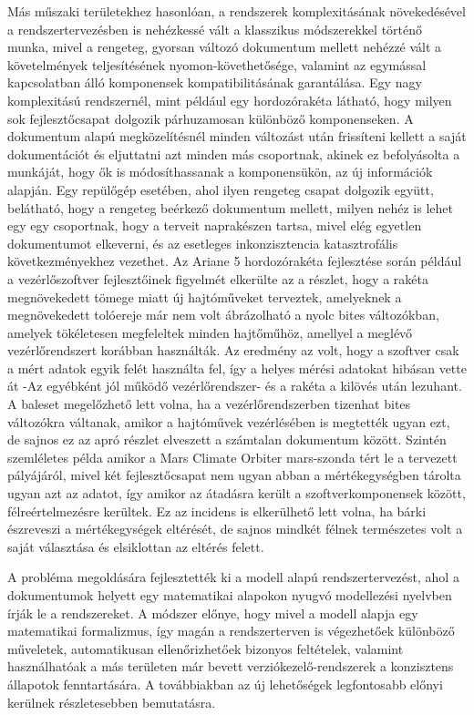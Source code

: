         Más műszaki területekhez hasonlóan, a rendszerek komplexitásának növekedésével a rendszertervezésben is nehézkessé vált a klasszikus módszerekkel történő munka, mivel a rengeteg, gyorsan változó dokumentum mellett nehézzé vált a követelmények teljesítésének nyomon-követhetősége, valamint az egymással kapcsolatban álló komponensek kompatibilitásának garantálása.
        Egy nagy komplexitású rendszernél, mint például egy hordozórakéta látható, hogy milyen sok fejlesztőcsapat dolgozik párhuzamosan különböző komponenseken. A dokumentum alapú megközelítésnél minden változást után frissíteni kellett a saját dokumentációt és eljuttatni azt minden más csoportnak, akinek ez befolyásolta a munkáját, hogy ők is módosíthassanak a komponensükön, az új információk alapján.
        Egy repülőgép esetében, ahol ilyen rengeteg csapat dolgozik együtt, belátható, hogy a rengeteg beérkező dokumentum mellett, milyen nehéz is lehet egy egy csoportnak, hogy a terveit naprakészen tartsa, mivel elég egyetlen dokumentumot elkeverni, és az esetleges inkonzisztencia katasztrofális következményekhez vezethet.
        Az Ariane 5 hordozórakéta fejlesztése során például a vezérlőszoftver fejlesztőinek figyelmét elkerülte az a részlet, hogy a rakéta megnövekedett tömege miatt új hajtóműveket terveztek, amelyeknek a megnövekedett tolóereje már nem volt ábrázolható a nyolc bites változókban, amelyek tökéletesen megfeleltek minden hajtőműhöz, amellyel a meglévő vezérlőrendszert korábban használták.
        Az eredmény az volt, hogy a szoftver csak a mért adatok egyik felét használta fel, így a helyes mérési adatokat hibásan vette át -Az egyébként jól működő vezérlőrendszer- és a rakéta a kilövés után lezuhant. \cite{Arinane5_1996}
        A baleset megelőzhető lett volna, ha a vezérlőrendszerben tizenhat bites változókra váltanak, amikor a hajtóművek vezérlésében is megtették ugyan ezt, de sajnos ez az apró részlet elveszett a számtalan dokumentum között.
        Szintén szemléletes példa amikor a Mars Climate Orbiter mars-szonda tért le a tervezett pályájáról, mivel két fejlesztőcsapat nem ugyan abban a mértékegységben tárolta ugyan azt az adatot, így amikor az átadásra került a szoftverkomponensek között, félreértelmezésre kerültek. Ez az incidens is elkerülhető lett volna, ha bárki észreveszi a mértékegységek eltérését, de sajnos mindkét félnek természetes volt a saját választása és elsiklottan az eltérés felett. \cite{MCO2009}

        A probléma megoldására fejlesztették ki a modell alapú rendszertervezést, ahol a dokumentumok helyett egy matematikai alapokon nyugvó modellezési nyelvben írják le a rendszereket. A módszer előnye, hogy mivel a modell alapja egy matematikai formalizmus, így magán a rendszerterven is végezhetőek különböző műveletek, automatikusan ellenőrizhetőek bizonyos feltételek, valamint használhatóak a más területen már bevett verziókezelő-rendszerek a konzisztens állapotok fenntartására.
        A továbbiakban az új lehetőségek legfontosabb előnyi kerülnek részletesebben bemutatásra.
        
